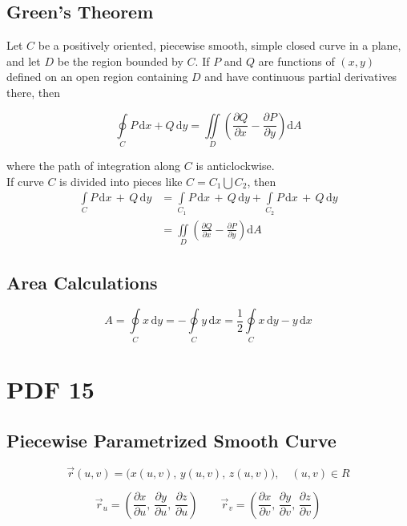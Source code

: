 \documentclass[12pt, fleqn]{book}
\newcommand{\D}{\mathrm{d}}
\newcommand{\ic}{\int\limits_C}
\newcommand{\oic}{\oint\limits_C}
\newcommand{\xy}{(x, y)}
\newcommand{\uv}{(u, v)}
\newcommand{\rond}[2]{\frac{\partial #1}{\partial #2}}
\begin{document}
		\section{Green's Theorem}
			Let $C$ be a positively oriented, piecewise smooth, simple closed curve in a plane, and let $D$ be the region bounded by $C$. If $P$ and $Q$ are functions of $\xy$ defined on an open region containing $D$ and have continuous partial derivatives there, then 
			
			\begin{equation}
				\oic  P \, \D x + Q \, \D y = \iint\limits_D \left(\rond{Q}{x} - \rond{P}{y}\right) \D A
			\end{equation}
		
		    where the path of integration along $C$ is anticlockwise. \\
		    
		    If curve $C$ is divided into pieces like $C = C_1 \bigcup C_2$, then
		    \begin{equation}
		    	\begin{split}
		    		\ic  P \, \D x \, + \, Q \, \D y & = \int\limits_{C_{1}} P \, \D x \, + \, Q \, \D y + \int\limits_{C_{2}} P \, \D x \, + \, Q \, \D y \\ 
		    		& = \iint\limits_D \left(\rond{Q}{x} - \rond{P}{y}\right) \D A
		    	\end{split}
		    \end{equation}		    
		\section{Area Calculations}
			\begin{equation}
				A = \oic  x \, \D y = - \oic  y \, \D x = \frac{1}{2} \oic  x \, \D y - y \, \D x
			\end{equation}		
\chapter{PDF 15}\label{pdf15}
	\section{Piecewise Parametrized Smooth Curve}
		\begin{equation}
			\vec{r}\uv = \big(x\uv, \, y\uv, \, z\uv\big), \quad \uv \in R
		\end{equation}
		
		\begin{equation}
			\vec{r}_u = (\rond{x}{u}, \, \rond{y}{u}, \, \rond{z}{u}) \qquad \vec{r}_v = (\rond{x}{v}, \, \rond{y}{v}, \, \rond{z}{v}) 
		\end{equation}	
\end{document}
